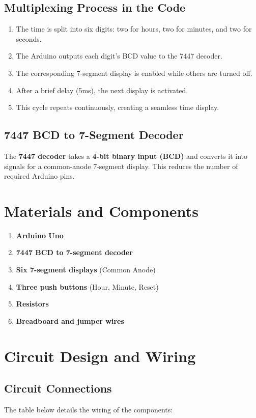 \documentclass[a4paper,12pt]{article}
\theoremstyle{remark}
\begin{document}
\subsection{Multiplexing Process in the Code}
\begin{enumerate}
    \item The time is split into six digits: two for hours, two for minutes, and two for seconds.
    \item The Arduino outputs each digit's BCD value to the 7447 decoder.
    \item The corresponding 7-segment display is enabled while others are turned off.
    \item After a brief delay (5ms), the next display is activated.
    \item This cycle repeats continuously, creating a seamless time display.
\end{enumerate}

\subsection{7447 BCD to 7-Segment Decoder}
The \textbf{7447 decoder} takes a \textbf{4-bit binary input (BCD)} and converts it into signals for a common-anode 7-segment display. This reduces the number of required Arduino pins.

\section{Materials and Components}
\begin{enumerate}
    \item \textbf{Arduino Uno}
    \item \textbf{7447 BCD to 7-segment decoder}
    \item \textbf{Six 7-segment displays} (Common Anode)
    \item \textbf{Three push buttons} (Hour, Minute, Reset)
    \item \textbf{Resistors} 
    \item \textbf{Breadboard and jumper wires}
\end{enumerate}

\section{Circuit Design and Wiring}
\subsection{Circuit Connections}
The table below details the wiring of the components:
\end{document}
